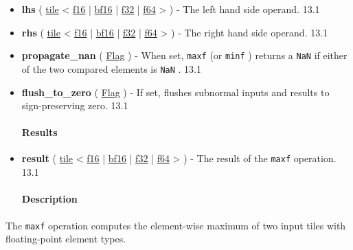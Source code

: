 \documentclass{article}
\begin{document}
\begin{itemize}
\item \textbf{lhs} ( \href{https://docs.nvidia.com/cuda/tile-ir/latest/sections/types.html#type-tile}{tile} < \href{https://docs.nvidia.com/cuda/tile-ir/latest/sections/types.html#subsection-element-types}{f16} | \href{https://docs.nvidia.com/cuda/tile-ir/latest/sections/types.html#subsection-element-types}{bf16} | \href{https://docs.nvidia.com/cuda/tile-ir/latest/sections/types.html#subsection-element-types}{f32} | \href{https://docs.nvidia.com/cuda/tile-ir/latest/sections/types.html#subsection-element-types}{f64} > ) - The left hand side operand. 13.1
\item \textbf{rhs} ( \href{https://docs.nvidia.com/cuda/tile-ir/latest/sections/types.html#type-tile}{tile} < \href{https://docs.nvidia.com/cuda/tile-ir/latest/sections/types.html#subsection-element-types}{f16} | \href{https://docs.nvidia.com/cuda/tile-ir/latest/sections/types.html#subsection-element-types}{bf16} | \href{https://docs.nvidia.com/cuda/tile-ir/latest/sections/types.html#subsection-element-types}{f32} | \href{https://docs.nvidia.com/cuda/tile-ir/latest/sections/types.html#subsection-element-types}{f64} > ) - The right hand side operand. 13.1
\item \textbf{propagate\_nan} ( \href{https://docs.nvidia.com/cuda/tile-ir/latest/sections/operations.html#type-flag}{Flag} ) - When set, \texttt{maxf} (or \texttt{minf} ) returns a \texttt{NaN} if either of the two compared elements is \texttt{NaN} . 13.1
\item \textbf{flush\_to\_zero} ( \href{https://docs.nvidia.com/cuda/tile-ir/latest/sections/operations.html#type-flag}{Flag} ) - If set, flushes subnormal inputs and results to sign-preserving zero. 13.1


\paragraph{Results}

\item \textbf{result} ( \href{https://docs.nvidia.com/cuda/tile-ir/latest/sections/types.html#type-tile}{tile} < \href{https://docs.nvidia.com/cuda/tile-ir/latest/sections/types.html#subsection-element-types}{f16} | \href{https://docs.nvidia.com/cuda/tile-ir/latest/sections/types.html#subsection-element-types}{bf16} | \href{https://docs.nvidia.com/cuda/tile-ir/latest/sections/types.html#subsection-element-types}{f32} | \href{https://docs.nvidia.com/cuda/tile-ir/latest/sections/types.html#subsection-element-types}{f64} > ) - The result of the \texttt{maxf} operation. 13.1


\paragraph{Description}

\end{itemize}
The \texttt{maxf} operation computes the element-wise maximum of two input tiles with floating-point element types.
\end{document}
